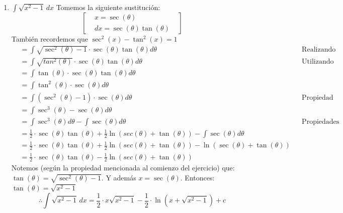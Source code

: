\documentclass[letterpaper]{article}
\renewcommand{\*}{\cdot}
\theoremstyle{definition}
\begin{document}
\begin{enumerate}
\begin{enumerate}
\item$\displaystyle \int \sqrt{x^2 - 1} \, dx$
Tomemos la siguiente sustitución:
\[  \begin{bmatrix}
& x = \sec(\theta) &\\
&dx = \sec(\theta)\tan(\theta)&
\end{bmatrix} \]
También recordemos que $\sec^{2}(x)-\tan^{2}(x)=1$
\begin{align*}
	&= \int \sqrt{\sec^{2}(\theta)-1}\cdot \sec(\theta)\tan(\theta)d\theta &&\text{Realizando la sustitución}\\
	&= \int \sqrt{tan^{2}(\theta)} \cdot \sec(\theta)\tan(\theta)d\theta &&\text{Utilizando la propiedad mencionada}\\
	&= \int \tan(\theta) \cdot \sec(\theta)\tan(\theta)d\theta \\
	&= \int \tan^{2}(\theta)\cdot \sec(\theta) d\theta\\
	&= \int (\sec^{2}(\theta)-1)\cdot \sec(\theta) d\theta &&\text{Propiedad anterior}\\
	&=\int \sec^{3}(\theta)-\sec(\theta)d\theta \\
	&= \int \sec^{3}(\theta)d\theta-\int \sec(\theta)d\theta &&\text{Propiedades de la integral}\\
	&= \frac{1}{2}\cdot \sec(\theta)\tan(\theta)+\frac{1}{2}\ln(sec(\theta)+\tan(\theta))-\int \sec(\theta)d\theta\\
	&=\frac{1}{2}\cdot \sec(\theta)\tan(\theta)+\frac{1}{2}\ln(sec(\theta)+\tan(\theta)) - \ln(\sec(\theta)+\tan(\theta))\\
	&=\frac{1}{2}\cdot \sec(\theta)\tan(\theta)-\frac{1}{2}\ln(sec(\theta)+\tan(\theta))
\end{align*}
Notemos (según la propiedad mencionada al comienzo del ejercicio) que: $\tan(\theta)= \sqrt{\sec^{2}(\theta)-1}$. Y además $x = \sec(\theta)$. Entonces: $\tan(\theta)=\sqrt{x^{2}-1}$
\[\therefore \int \sqrt{x^2 - 1} \, dx= \frac{1}{2}\cdot x\sqrt{x^{2}-1}-\frac{1}{2}\cdot\ln(x+\sqrt{x^{2}-1})+c\]



\end{enumerate}
\end{enumerate}
\end{document}
